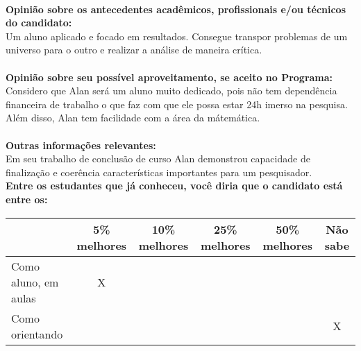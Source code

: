 \documentclass[11pt]{article}
\begin{document}
\\
\textbf{Opinião sobre os antecedentes acadêmicos, profissionais e/ou técnicos do candidato:}
\\Um aluno aplicado e focado em resultados. Consegue transpor problemas de um universo para o outro e realizar a análise de maneira crítica.\\
\\
\textbf{Opinião sobre seu possível aproveitamento, se aceito no Programa:}
\\Considero que Alan será um aluno muito dedicado, pois não tem dependência financeira de trabalho o que faz com que ele possa estar 24h imerso na pesquisa. Além disso, Alan tem facilidade com a área da mátemática.\\ 
\\
\textbf{Outras informações relevantes:} \\Em seu trabalho de conclusão de curso Alan demonstrou capacidade de finalização e coerência características importantes para um pesquisador.
\\[0.3cm]
\textbf{Entre os estudantes que já conheceu, você diria que o candidato está entre os:}
\\
\begin{tabular}{|l|c|c|c|c|c|}
\hline
 & 5\% melhores & 10\% melhores & 25\% melhores & 50\% melhores & Não sabe \\
\hline
Como aluno, em aulas & X &  &  &  & \\
\hline
Como orientando &  &  &  &  & X\\
\hline
\end{tabular}
\end{document}
